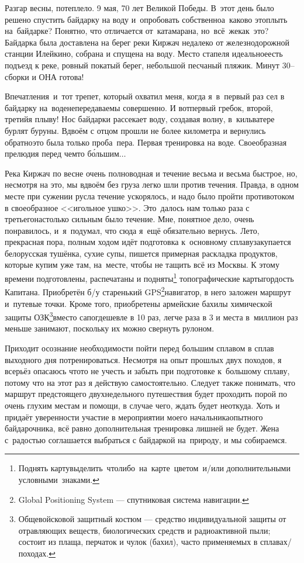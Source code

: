 Разгар весны, потеплело. 9 мая, 70 лет Великой Победы. В~этот день было решено спустить байдарку на воду и~опробовать собственно\mdash а~каково это\mdash плыть на~байдарке? Понятно, что отличается от~катамарана, но~всё~же\mdash как~это? Байдарка была доставлена на берег реки Киржач недалеко от железнодорожной станции Илейкино, собрана и спущена на воду. Место стапеля идеальное\mdash есть подъезд к реке, ровный покатый берег, небольшой песчаный пляжик. Минут 30\thinspace-- сборки и ОНА готова! 

Впечатления~и~тот трепет, который охватил меня, когда я~в~первый раз сел в байдарку на~воде\mdash непередаваемы совершенно. И вот\mdash первый гребок, второй, третий\mdash я плыву! Нос байдарки рассекает воду, создавая волну, в~кильватере бурлят буруны. Вдвоём с отцом прошли не более километра и вернулись обратно\mdash это была только проба~пера. Первая тренировка на воде. Своеобразная прелюдия перед чем\sdash то б\'{о}льшим$\ldots$
 
Река Киржач по весне очень полноводная и течение весьма и весьма быстрое, но, несмотря на это, мы вдвоём без груза легко шли против течения. Правда, в одном месте при сужении русла течение ускорялось, и надо было пройти противотоком в своеобразное <<игольное ушко>>. Это~далось нам только раза с третьего\mdash настолько сильным было течение. Мне, понятное дело, очень понравилось, и~я~подумал, что сюда я~ещё обязательно вернусь. 
\newpage
Лето, прекрасная пора, полным ходом идёт подготовка к~основному сплаву\mdash закупается белорусская тушёнка, сухие супы, пишется примерная раскладка продуктов, которые купим уже там, на~месте, чтобы не тащить всё из Москвы. К этому времени подготовлены, распечатаны и подняты\footnote[1]{Поднять карту\mdash выделить что\sdash либо на карте цветом и/или дополнительными условными знаками.} топографические карты\mdash гордость Капитана. Приобретён б/у старенький GPS\footnote[2]{Global Positioning System --- спутниковая система навигации.}\sdash навигатор, в него заложен маршрут и~путевые точки. Кроме того, приобретены армейские бахилы химической защиты ОЗК\footnote[3]{Общевойсковой защитный костюм --- средство индивидуальной защиты от отравляющих веществ, биологических средств и радиоактивной пыли; состоит из плаща, перчаток и чулок (бахил), часто применяемых в сплавах/походах.}\mdash вместо сапог\mdash дешевле в 10 раз, легче раза в 3 и места в~миллион раз меньше занимают, поскольку их можно свернуть рулоном. 

Приходит осознание необходимости пойти перед большим сплавом в сплав выходного дня потренироваться. Несмотря на опыт прошлых двух походов, я всерьёз опасаюсь что\sdash то не учесть и забыть при подготовке к~большому сплаву, потому что на этот раз я действую самостоятельно. Следует также понимать, что маршрут предстоящего двухнедельного путешествия будет проходить порой по очень глухим местам и помощи, в случае чего, ждать будет неоткуда. Хоть и придаёт уверенности участие в мероприятии моего начальника\mdash опытного байдарочника, всё равно дополнительная тренировка лишней не будет. Жена с~радостью соглашается выбраться с байдаркой на~природу, и мы собираемся.

